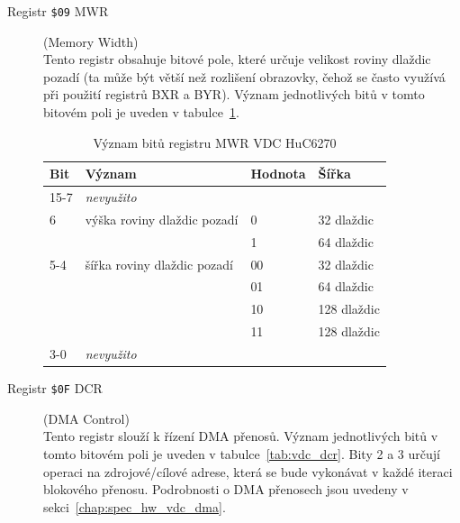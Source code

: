 \begin{description}
\item[Registr {\tt \$09} {\sf MWR}] (Memory Width) \\
	Tento registr obsahuje bitové pole, které určuje velikost roviny dlaždic
	pozadí (ta může být větší než rozlišení obrazovky, čehož se často využívá
	při použití registrů {\sf BXR} a {\sf BYR}). Význam jednotlivých bitů v
	tomto bitovém poli je uveden v tabulce~\ref{tab:vdc_mwr}.

	\begin{table}[ht]
	\begin{center}
	\begin{tabular}{|l|l|l|l|}
	\hline
	\textbf{Bit} & \textbf{Význam} & \textbf{Hodnota} & \textbf{Šířka} \\
	\hline
	15-7 & {\em nevyužito} && \\
	6 & výška roviny dlaždic pozadí & 0 & 32 dlaždic \\
		& & 1 & 64 dlaždic \\
	5-4 & šířka roviny dlaždic pozadí & 00 & 32 dlaždic \\
		& & 01 & 64 dlaždic \\
		& & 10 & 128 dlaždic \\
		& & 11 & 128 dlaždic \\
	3-0 & {\em nevyužito} && \\
	\hline
	\end{tabular}
	\end{center}
		\caption{Význam bitů registru {\sf MWR} VDC HuC6270\label{tab:vdc_mwr}}
	\end{table}

\item[Registr {\tt \$0F} {\sf DCR}] (DMA Control) \\
	Tento registr slouží k řízení DMA přenosů. Význam jednotlivých bitů v tomto
	bitovém poli je uveden v tabulce~\ref{tab:vdc_dcr}. Bity 2 a 3 určují
	operaci na zdrojové/cílové adrese, která se bude vykonávat v každé iteraci
	blokového přenosu. Podrobnosti o DMA přenosech jsou uvedeny v
	sekci~\ref{chap:spec_hw_vdc_dma}.


\end{description}
